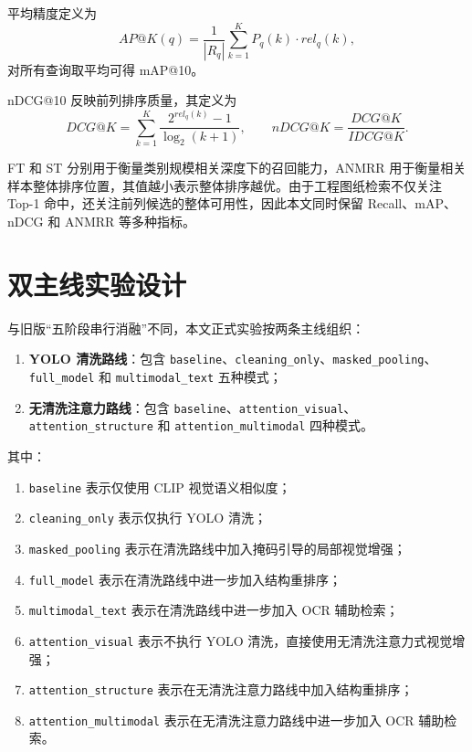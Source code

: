 平均精度定义为
\begin{equation}
  AP@K(q)=\frac{1}{|R_q|}\sum_{k=1}^{K} P_q(k)\cdot rel_q(k),
\end{equation}
对所有查询取平均可得 mAP@10。

nDCG@10 反映前列排序质量，其定义为
\begin{equation}
  DCG@K = \sum_{k=1}^{K}\frac{2^{rel_q(k)}-1}{\log_2(k+1)},\qquad
  nDCG@K = \frac{DCG@K}{IDCG@K}.
\end{equation}

FT 和 ST 分别用于衡量类别规模相关深度下的召回能力，ANMRR 用于衡量相关样本整体排序位置，其值越小表示整体排序越优。由于工程图纸检索不仅关注 Top-1 命中，还关注前列候选的整体可用性，因此本文同时保留 Recall、mAP、nDCG 和 ANMRR 等多种指标。

\section{双主线实验设计}

与旧版“五阶段串行消融”不同，本文正式实验按两条主线组织：
\begin{enumerate}
  \item \textbf{YOLO 清洗路线}：包含 \texttt{baseline}、\texttt{cleaning\_only}、\texttt{masked\_pooling}、\texttt{full\_model} 和 \texttt{multimodal\_text} 五种模式；
  \item \textbf{无清洗注意力路线}：包含 \texttt{baseline}、\texttt{attention\_visual}、\texttt{attention\_structure} 和 \texttt{attention\_multimodal} 四种模式。
\end{enumerate}

其中：
\begin{enumerate}
  \item \texttt{baseline} 表示仅使用 CLIP 视觉语义相似度；
  \item \texttt{cleaning\_only} 表示仅执行 YOLO 清洗；
  \item \texttt{masked\_pooling} 表示在清洗路线中加入掩码引导的局部视觉增强；
  \item \texttt{full\_model} 表示在清洗路线中进一步加入结构重排序；
  \item \texttt{multimodal\_text} 表示在清洗路线中进一步加入 OCR 辅助检索；
  \item \texttt{attention\_visual} 表示不执行 YOLO 清洗，直接使用无清洗注意力式视觉增强；
  \item \texttt{attention\_structure} 表示在无清洗注意力路线中加入结构重排序；
  \item \texttt{attention\_multimodal} 表示在无清洗注意力路线中进一步加入 OCR 辅助检索。
\end{enumerate}


